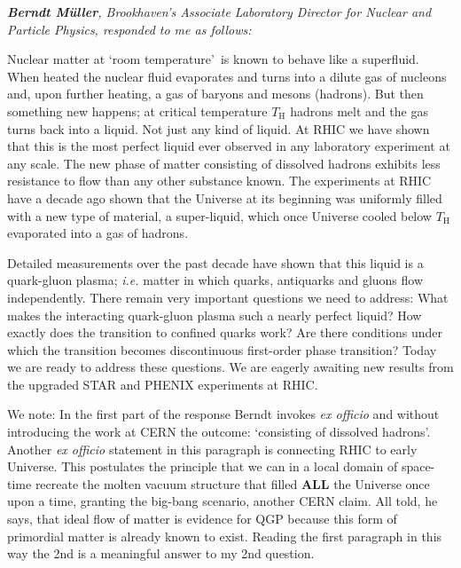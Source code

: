 \noindent \textit{\textbf{Berndt M\"uller}, Brookhaven\rq s Associate Laboratory Director for Nuclear and Particle Physics, responded to me as follows:}\\[-0.7cm]
%
\begin{mdframed}[linecolor=gray,roundcorner=12pt,backgroundcolor=GreenYellow!15,linewidth=1pt,leftmargin=0cm,rightmargin=0cm,topline=true,bottomline=true,skipabove=12pt]\relax%
% 
Nuclear matter at \lq room temperature\rq\ is known to behave like a superfluid. When heated the nuclear fluid evaporates and turns into a dilute gas of nucleons and, upon further heating, a gas of baryons and mesons (hadrons). But then something new happens; at critical temperature $T_\mathrm{H}$ hadrons melt and the gas turns back into a liquid. Not just any kind of liquid. At RHIC we have shown that this is the most perfect liquid ever observed in any laboratory experiment at any scale. The new phase of matter consisting of dissolved hadrons exhibits less resistance to flow than any other substance known. The experiments at RHIC have a decade ago shown that the Universe at its beginning was uniformly filled with a new type of material, a super-liquid, which once Universe cooled below $T_\mathrm{H}$ evaporated into a gas of hadrons. 

Detailed measurements over the past decade have shown that this liquid is a quark-gluon plasma; \textit{i.e.\/} matter in which quarks, antiquarks and gluons flow independently. There remain very important questions we need to address: What makes the interacting quark-gluon plasma such a nearly perfect liquid? How exactly does the transition to confined quarks work? Are there conditions under which the transition becomes discontinuous first-order phase transition? Today we are ready to address these questions. We are eagerly awaiting new results from the upgraded STAR and PHENIX experiments at RHIC.
\end{mdframed}
%
We note: In the first part of the response Berndt invokes \textit{ex officio} and without introducing the work at CERN the outcome: \lq consisting of dissolved hadrons\rq. Another \textit{ex officio} statement in this paragraph is connecting RHIC to early Universe. This postulates the principle that we can in a local domain of space-time recreate the molten vacuum structure that filled \textbf{ALL} the Universe once upon a time, granting the big-bang scenario, another CERN claim. All told, he says, that ideal flow of matter is evidence for QGP because this form of primordial matter is already known to exist. Reading the first paragraph in this way the 2nd is a meaningful answer to my 2nd question.

